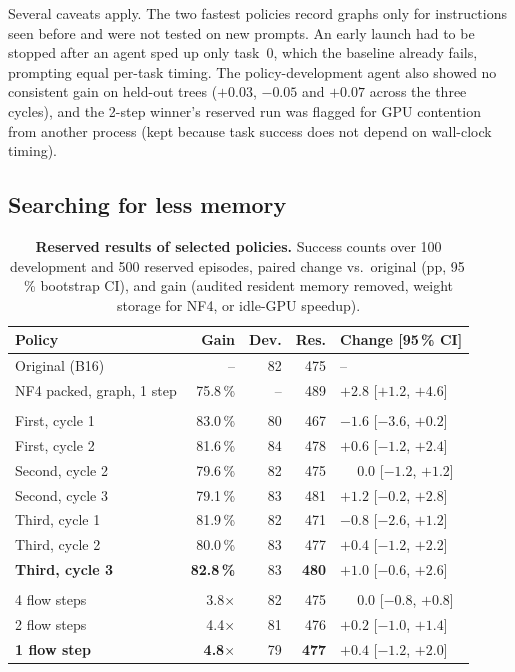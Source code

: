 \documentclass[conference]{IEEEtran}
\begin{document}
Several caveats apply. The two fastest policies record graphs only for instructions seen before and
were not tested on new prompts. An early launch had to be stopped after an agent sped up only
task~0, which the baseline already fails, prompting equal per-task timing. The policy-development
agent also showed no consistent gain on held-out trees ($+0.03$, $-0.05$ and $+0.07$ across the
three cycles), and the 2-step winner's reserved run was flagged for GPU contention from another
process (kept because task success does not depend on wall-clock timing).

\subsection{Searching for less memory}
\begin{table}[t]
\centering
\caption{\textbf{Reserved results of selected policies.} Success counts over 100 development and
500 reserved episodes, paired change vs.\ original (pp, 95\,\% bootstrap CI), and gain (audited
resident memory removed, weight storage for NF4, or idle-GPU speedup).}
\label{tab:reserved}
\footnotesize
\setlength{\tabcolsep}{3.0pt}
\begin{tabular}{@{}lrrrl@{}}
\toprule
\sffamily Policy & \sffamily Gain & \sffamily Dev. & \sffamily Res. & \sffamily Change [95\,\% CI] \\
\midrule
Original (B16) & -- & 82 & 475 & -- \\
NF4 packed, graph, 1 step & 75.8\,\% & -- & 489 & $+2.8$ [$+1.2$, $+4.6$] \\
\addlinespace[2pt]
\multicolumn{5}{@{}l}{\scriptsize\sffamily\color{ink2} MEMORY SEARCHES} \\
First, cycle 1 & 83.0\,\% & 80 & 467 & $-1.6$ [$-3.6$, $+0.2$] \\
First, cycle 2 & 81.6\,\% & 84 & 478 & $+0.6$ [$-1.2$, $+2.4$] \\
Second, cycle 2 & 79.6\,\% & 82 & 475 & $\phantom{+}0.0$ [$-1.2$, $+1.2$] \\
Second, cycle 3 & 79.1\,\% & 83 & 481 & $+1.2$ [$-0.2$, $+2.8$] \\
Third, cycle 1 & 81.9\,\% & 82 & 471 & $-0.8$ [$-2.6$, $+1.2$] \\
Third, cycle 2 & 80.0\,\% & 83 & 477 & $+0.4$ [$-1.2$, $+2.2$] \\
\rowcolor{rowhi}\textbf{Third, cycle 3} & \textbf{82.8\,\%} & 83 & \textbf{480} & $+1.0$ [$-0.6$, $+2.6$] \\
\addlinespace[2pt]
\multicolumn{5}{@{}l}{\scriptsize\sffamily\color{ink2} SPEED SEARCH (SPEEDUP)} \\
4 flow steps & 3.8$\times$ & 82 & 475 & $\phantom{+}0.0$ [$-0.8$, $+0.8$] \\
2 flow steps & 4.4$\times$ & 81 & 476 & $+0.2$ [$-1.0$, $+1.4$] \\
\rowcolor{rowhi}\textbf{1 flow step} & \textbf{4.8$\times$} & 79 & \textbf{477} & $+0.4$ [$-1.2$, $+2.0$] \\
\bottomrule
\end{tabular}
\end{table}
\end{document}
